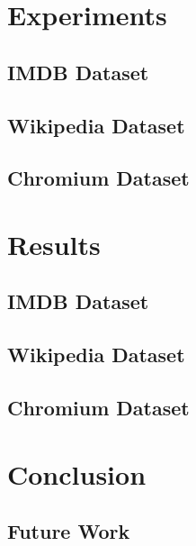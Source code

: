 \documentclass[11pt]{article}
\begin{document}
\section*{Experiments}

\subsection*{IMDB Dataset}

\subsection*{Wikipedia Dataset}

\subsection*{Chromium Dataset}


\section*{Results}

\subsection*{IMDB Dataset}

\subsection*{Wikipedia Dataset}

\subsection*{Chromium Dataset}


\section*{Conclusion}


\subsection*{Future Work}

\printbibliography
\end{document}
